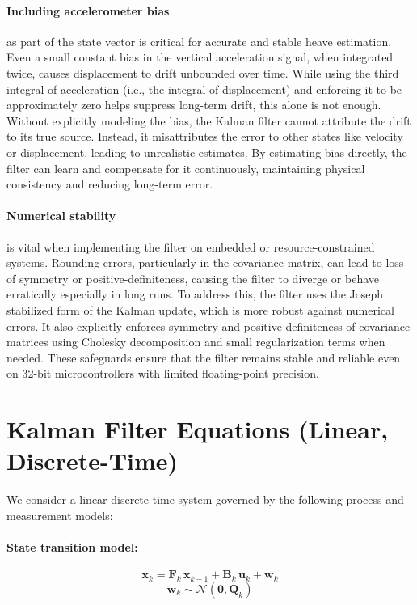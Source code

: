 \documentclass[11pt,letterpaper]{article}
\begin{document}
\paragraph{Including accelerometer bias}
as part of the state vector is critical for accurate and stable heave estimation. Even a small constant bias in the vertical acceleration signal, when integrated twice, causes displacement to drift unbounded over time. While using the third integral of acceleration (i.e., the integral of displacement) and enforcing it to be approximately zero helps suppress long-term drift, this alone is not enough. Without explicitly modeling the bias, the Kalman filter cannot attribute the drift to its true source. Instead, it misattributes the error to other states like velocity or displacement, leading to unrealistic estimates. By estimating bias directly, the filter can learn and compensate for it continuously, maintaining physical consistency and reducing long-term error.

\paragraph{Numerical stability}
is vital when implementing the filter on embedded or resource-constrained systems. Rounding errors, particularly in the covariance matrix, can lead to loss of symmetry or positive-definiteness, causing the filter to diverge or behave erratically especially in long runs. To address this, the filter uses the Joseph stabilized form of the Kalman update, which is more robust against numerical errors. It also explicitly enforces symmetry and positive-definiteness of covariance matrices using Cholesky decomposition and small regularization terms when needed. These safeguards ensure that the filter remains stable and reliable even on 32-bit microcontrollers with limited floating-point precision.

\section{Kalman Filter Equations (Linear, Discrete-Time)}

We consider a linear discrete-time system governed by the following process and measurement models:

\paragraph{State transition model:}
\begin{equation}
    \mathbf{x}_k = \mathbf{F}_k \, \mathbf{x}_{k-1} + \mathbf{B}_k \, \mathbf{u}_k + \mathbf{w}_k
\end{equation}
\begin{equation}
    \mathbf{w}_k \sim \mathcal{N}(\mathbf{0}, \mathbf{Q}_k)
\end{equation}
\end{document}
